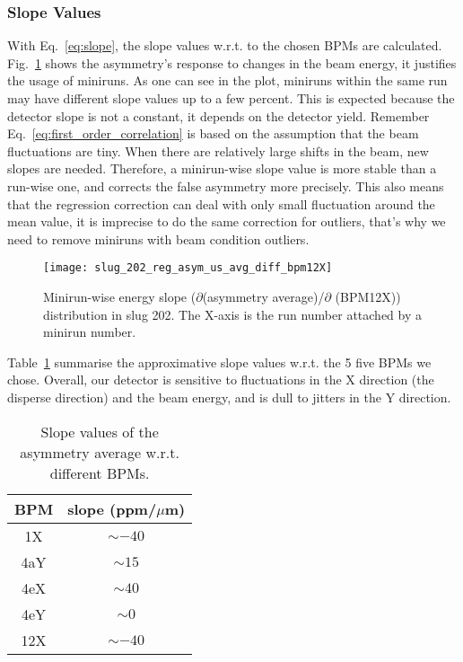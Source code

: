 \subsubsection{Slope Values}
With Eq.~\ref{eq:slope}, the slope values w.r.t. to the chosen BPMs are calculated. 
Fig.~\ref{fig:slug_202_reg_asym_us_avg_diff_bpm12X} shows the asymmetry's response
to changes in the beam energy, it justifies the usage of miniruns. 
As one can see in the plot, miniruns within the same run may have different 
slope values up to a few percent. This is expected because the detector slope 
is not a constant, it depends on the detector yield. 
Remember Eq.~\ref{eq:first_order_correlation} is based on the assumption that 
the beam fluctuations are tiny. When there are relatively large shifts in the 
beam, new slopes are needed. Therefore, a minirun-wise slope value is 
more stable than a run-wise one, and corrects the false asymmetry more precisely. 
This also means that the regression correction can deal with only small fluctuation 
around the mean value, it is imprecise to do the same correction for outliers, that's why
we need to remove miniruns with beam condition outliers.
\begin{figure}[!h]
    \centering
    \texttt{[image: slug\_202\_reg\_asym\_us\_avg\_diff\_bpm12X]}
    \caption{Minirun-wise energy slope ($\partial$(asymmetry average)/$\partial$ (BPM12X)) 
    distribution in slug 202. The X-axis is the run number attached by a minirun number.}
    \label{fig:slug_202_reg_asym_us_avg_diff_bpm12X}
\end{figure}

Table~\ref{tab:crex_slope} summarise the approximative slope values w.r.t. the 5
five BPMs we chose. Overall, our detector is sensitive to fluctuations in the X direction
(the disperse direction) and the beam energy, and is dull to jitters in the Y direction.
\begin{table}[!h]
    \centering
    \begin{tabular}{c | c}
	\hline
	BPM & slope (ppm/$\mu$m)   \\
	\hline
	1X  & $\sim -40$    \\
	4aY & $\sim 15$    \\
	4eX & $\sim 40$	\\
	4eY & $\sim 0$	\\
	12X & $\sim -40$    \\
	\hline
    \end{tabular}
    \caption{Slope values of the asymmetry average w.r.t. different BPMs.}
    \label{tab:crex_slope}
\end{table}


